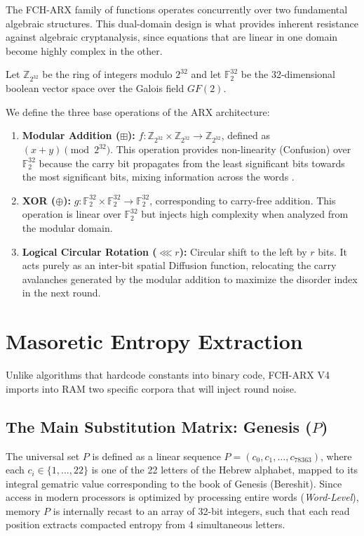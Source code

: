 \documentclass[10pt,journal,compsoc]{IEEEtran}
\begin{document}
The FCH-ARX family of functions operates concurrently over two fundamental algebraic structures. This dual-domain design is what provides inherent resistance against algebraic cryptanalysis, since equations that are linear in one domain become highly complex in the other.

Let $\mathbb{Z}_{2^{32}}$ be the ring of integers modulo $2^{32}$ and let $\mathbb{F}_2^{32}$ be the 32-dimensional boolean vector space over the Galois field $GF(2)$.

We define the three base operations of the ARX architecture:
\begin{enumerate}
    \item \textbf{Modular Addition ($\boxplus$):} $f: \mathbb{Z}_{2^{32}} \times \mathbb{Z}_{2^{32}} \to \mathbb{Z}_{2^{32}}$, defined as $(x + y) \pmod{2^{32}}$. This operation provides non-linearity (Confusion) over $\mathbb{F}_2^{32}$ because the carry bit propagates from the least significant bits towards the most significant bits, mixing information across the words \cite{mouha2011differential}.
    \item \textbf{XOR ($\oplus$):} $g: \mathbb{F}_2^{32} \times \mathbb{F}_2^{32} \to \mathbb{F}_2^{32}$, corresponding to carry-free addition. This operation is linear over $\mathbb{F}_2^{32}$ but injects high complexity when analyzed from the modular domain.
    \item \textbf{Logical Circular Rotation ($\lll r$):} Circular shift to the left by $r$ bits. It acts purely as an inter-bit spatial Diffusion function, relocating the carry avalanches generated by the modular addition to maximize the disorder index in the next round.
\end{enumerate}

\section{Masoretic Entropy Extraction}

Unlike algorithms that hardcode constants into binary code, FCH-ARX V4 imports into RAM two specific corpora that will inject round noise.

\subsection{The Main Substitution Matrix: Genesis ($P$)}
The universal set $P$ is defined as a linear sequence $P = (c_0, c_1, \dots, c_{78363})$, where each $c_i \in \{1, \dots, 22\}$ is one of the 22 letters of the Hebrew alphabet, mapped to its integral gematric value corresponding to the book of Genesis (Bereshit).
Since access in modern processors is optimized by processing entire words (\textit{Word-Level}), memory $P$ is internally recast to an array of 32-bit integers, such that each read position extracts compacted entropy from 4 simultaneous letters.
\end{document}
